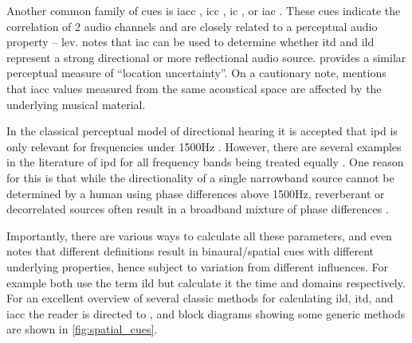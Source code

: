 \documentclass[referee,pdflatex,sn-mathphys-num]{sn-jnl}%
\newcommand{\q}[1]{\enquote{#1}}
\begin{document}
Another common family of cues is \gls{iacc} \cite{choiObjectiveMeasurementPerceived2008,delgadoDesignChoicesBinaural2023,nastasiPsychoAcousticalExperimentUsing2020,nowakQualityAssessmentSpherical2019}, \gls{icc} \cite{hyunEstimationQuantizationICCdependent2012,uhleSubbandCenterScaling2014}, \gls{ic} \cite{serraMonotostereoParametricStereo2023}, or \gls{iac} \cite{fallerSourceLocalizationComplex2004}. These cues indicate the correlation of 2 audio channels and are closely related to a perceptual audio property -- \gls{lev}. \cite{fallerSourceLocalizationComplex2004} notes that \gls{iac} can be used to determine whether \gls{itd} and \gls{ild} represent a strong directional or more reflectional audio source. \cite{desenaLocalizationUncertaintyTimeAmplitude2020} provides a similar perceptual measure of \q{location uncertainty}. On a cautionary note, \cite{nastasiPsychoAcousticalExperimentUsing2020} mentions that \gls{iacc} values measured from the same acoustical space are affected by the underlying musical material.

In the classical perceptual model of directional hearing it is accepted that \gls{ipd} is only relevant for frequencies under 1500Hz \cite{morinagaEvaluationMethodCoded,iso-11172-3:mpeg_audio}. However, there are several examples in the literature of \gls{ipd} for all frequency bands being treated equally \cite{prestiVisualizationManipulationStereophonic2014,tardieuProductionEffectAudio2011,hernandez-olivanInterauralTimeDifference2024}. One reason for this is that while the directionality of a single narrowband source cannot be determined by a human using phase differences above 1500Hz, reverberant or decorrelated sources often result in a broadband mixture of phase differences \cite{razzaqAdvancedDSPAlgorithm2016}.

Importantly, there are various ways to calculate all these parameters, and \cite{thaleiserBinauralProjectionMultichannelWiener2023} even notes that different definitions result in binaural/spatial cues with different underlying properties, hence subject to variation from different influences. For example \cite{chenSpatialParametersAudio2010,chenMultimediaApplicationSpatial2010} both use the term \gls{ild} but calculate it the time and  domains respectively. For an excellent overview of several classic methods for calculating \gls{ild}, \gls{itd}, and \gls{iacc} the reader is directed to \cite{supperOnsetGuidedSpatialAnalyser2005}, and block diagrams showing some generic methods are shown in \cref{fig:spatial_cues}. 
\end{document}

